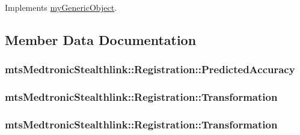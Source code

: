 Implements \hyperlink{classmy_generic_object_a261039f68cd49c1f275f0d209847b493}{my\-Generic\-Object}.



\subsection{Member Data Documentation}
\hypertarget{classmts_medtronic_stealthlink_1_1_registration_a5b21efb7c29a6f78b4c43bc92552373f}{
\subsubsection[{Predicted\-Accuracy}]{ mts\-Medtronic\-Stealthlink\-::\-Registration\-::\-Predicted\-Accuracy}}\label{classmts_medtronic_stealthlink_1_1_registration_a5b21efb7c29a6f78b4c43bc92552373f}
\hypertarget{classmts_medtronic_stealthlink_1_1_registration_acc9160a53480e54c3c2a51375ab81d87}{
\subsubsection[{Transformation}]{ mts\-Medtronic\-Stealthlink\-::\-Registration\-::\-Transformation}}\label{classmts_medtronic_stealthlink_1_1_registration_acc9160a53480e54c3c2a51375ab81d87}
\hypertarget{classmts_medtronic_stealthlink_1_1_registration_a8c2a0cf1ca74ea838d4ffd0b5feb3124}{
\subsubsection[{Transformation}]{ mts\-Medtronic\-Stealthlink\-::\-Registration\-::\-Transformation}}\label{classmts_medtronic_stealthlink_1_1_registration_a8c2a0cf1ca74ea838d4ffd0b5feb3124}
